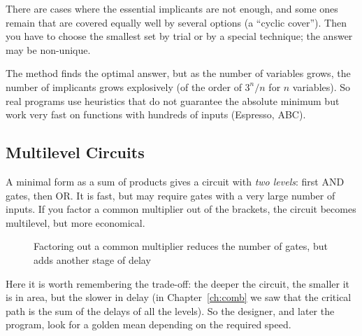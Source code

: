 There are cases where the essential implicants are not enough, and some ones
remain that are covered equally well by several options (a ``cyclic cover'').
Then you have to choose the smallest set by trial or by a special technique;
the answer may be non-unique.

The method finds the optimal answer, but as the number of variables grows, the
number of implicants grows explosively (of the order of $3^n/n$ for $n$
variables). So real programs use heuristics that do not guarantee the absolute
minimum but work very fast on functions with hundreds of inputs (Espresso,
ABC).

\subsection{Multilevel Circuits}

A minimal form as a sum of products gives a circuit with \emph{two levels}:
first AND gates, then OR. It is fast, but may require gates with a very large
number of inputs. If you factor a common multiplier out of the brackets, the
circuit becomes multilevel, but more economical.

\begin{figure}[H]
\centering
{}
\caption{Factoring out a common multiplier reduces the number of gates, but adds another stage of delay}
\end{figure}

Here it is worth remembering the trade-off: the deeper the circuit, the
smaller it is in area, but the slower in delay (in Chapter~\ref{ch:comb} we
saw that the critical path is the sum of the delays of all the levels). So
the designer, and later the program, look for a golden mean depending on the
required speed.

